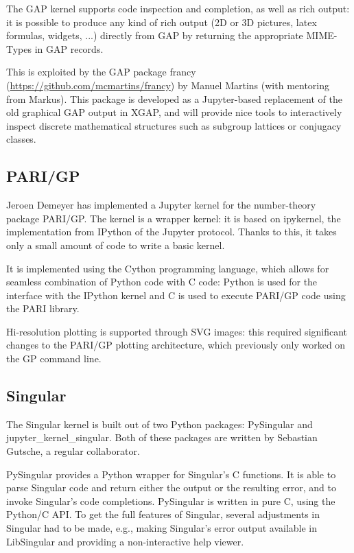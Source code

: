 \documentclass{deliverablereport}
\begin{document}
The GAP kernel supports code inspection and completion, as well as
rich output: it is possible to produce any kind of rich output (2D or
3D pictures, latex formulas, widgets, ...) directly from GAP by
returning the appropriate MIME-Types in GAP records.

This is exploited by the GAP package francy
(\url{https://github.com/mcmartins/francy}) by Manuel Martins (with
mentoring from Markus). This package is developed as a Jupyter-based
replacement of the old graphical GAP output in XGAP, and will provide
nice tools to interactively inspect discrete mathematical structures
such as subgroup lattices or conjugacy classes.

\subsection{PARI/GP}

Jeroen Demeyer has implemented a Jupyter kernel for the number-theory package PARI/GP.
The kernel is a wrapper kernel:
it is based on ipykernel, the implementation from IPython of the Jupyter protocol.
Thanks to this, it takes only a small amount of code to write a basic kernel.

It is implemented using the Cython programming language,
which allows for seamless combination of Python code with C code:
Python is used for the interface with the IPython kernel and C is used to execute PARI/GP code
using the PARI library.

Hi-resolution plotting is supported through SVG images: this required significant changes to the PARI/GP
plotting architecture, which previously only worked on the GP command line.

\subsection{Singular}

The Singular kernel is built out of two Python packages: PySingular and jupyter\_kernel\_singular.
Both of these packages are written by Sebastian Gutsche, a regular
\ODK collaborator.

PySingular provides a Python wrapper for Singular's C functions.
It is able to parse Singular code and return either the
output or the resulting error, and to invoke Singular's code completions.
PySingular is written in pure C, using the Python/C API.
To get the full features of Singular, several adjustments in Singular had to be made,
e.g., making Singular's error output available in LibSingular and providing a non-interactive help viewer.
\end{document}
